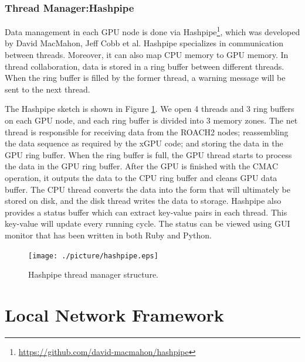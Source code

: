 \documentclass{ws-jai}
\begin{document}
\subsubsection{Thread Manager:Hashpipe}	
	
	Data management in each GPU node is done via Hashpipe\footnote{\url{https://github.com/david-macmahon/hashpipe}}, which was developed by David MacMahon, Jeff Cobb et al. Hashpipe specializes in communication between threads. Moreover, it can also map CPU memory to GPU memory. In thread collaboration, data is stored in a ring buffer between different threads. When the ring buffer is filled by the former thread, a warning message will be sent to the next thread. 

	The Hashpipe sketch is shown in Figure \ref{fig:hashpipe}. We open 4 threads and 3 ring buffers on each GPU node, and each ring buffer is divided into 3 memory zones. The net thread is responsible for receiving data from the ROACH2 nodes; reassembling the data sequence as required by the xGPU code; and storing the data in the GPU ring buffer. When the ring buffer is full, the GPU thread starts to process the data in the GPU ring buffer. After the GPU is finished with the CMAC operation, it outputs the data to the CPU ring buffer and cleans GPU data buffer. The CPU thread converts the data into the form that will ultimately be stored on disk, and the disk thread writes the data to storage.
	Hashpipe also provides a status buffer which can extract key-value pairs in each thread. This key-value will update every running cycle. The status can be viewed using GUI monitor that has been written in both Ruby and Python. 
\begin{figure}[t]
 \centering
 \texttt{[image: ./picture/hashpipe.eps]}
\caption{Hashpipe thread manager structure.\label{fig:hashpipe}}
\end{figure}

\section{Local Network Framework \label{sec:Local Network}}
\end{document}
